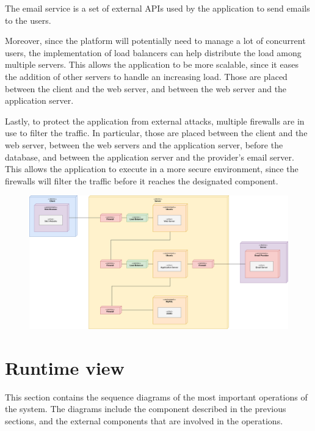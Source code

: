 The email service is a set of external APIs used by the application to send emails to the users.

Moreover, since the platform will potentially need to manage a lot of concurrent users, the implementation of load balancers can help distribute the load among multiple servers.
This allows the application to be more scalable, since it eases the addition of other servers to handle an increasing load.
Those are placed between the client and the web server, and between the web server and the application server.

Lastly, to protect the application from external attacks, multiple firewalls are in use to filter the traffic.
In particular, those are placed between the client and the web server, between the web servers and the application server, before the database, and between the application server and the provider's email server.
This allows the application to execute in a more secure environment, since the firewalls will filter the traffic before it reaches the designated component.

\begin{figure}[H]
    \centering
    \includegraphics[width=0.8\linewidth]{../assets/deployment-diagrams/deployment-diagram.png}
\end{figure}

\section{Runtime view}

This section contains the sequence diagrams of the most important operations of the system.
The diagrams include the component described in the previous sections, and the external components that are involved in the operations.

